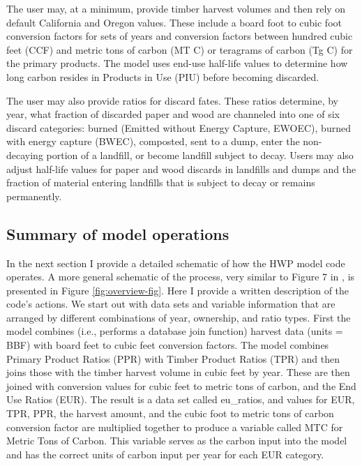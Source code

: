 \documentclass[
]{book}
\begin{document}
The user may, at a minimum, provide timber harvest volumes and then rely on default California and Oregon values. These include a board foot to cubic foot conversion factors for sets of years and conversion factors between hundred cubic feet (CCF) and metric tons of carbon (MT C) or teragrams of carbon (Tg C) for the primary products. The model uses end-use half-life values to determine how long carbon resides in Products in Use (PIU) before becoming discarded.

The user may also provide ratios for discard fates. These ratios determine, by year, what fraction of discarded paper and wood are channeled into one of six discard categories: burned (Emitted without Energy Capture, EWOEC), burned with energy capture (BWEC), composted, sent to a dump, enter the non-decaying portion of a landfill, or become landfill subject to decay. Users may also adjust half-life values for paper and wood discards in landfills and dumps and the fraction of material entering landfills that is subject to decay or remains permanently.

\hypertarget{model-func-opp}{%
\subsection{Summary of model operations}\label{model-func-opp}}

In the next section I provide a detailed schematic of how the HWP model code operates. A more general schematic of the process, very similar to Figure 7 in \citet{stockmann2012}, is presented in Figure \ref{fig:overview-fig}. Here I provide a written description of the code's actions. We start out with data sets and variable information that are arranged by different combinations of year, ownership, and ratio types. First the model combines (i.e., performs a database join function) harvest data (units = BBF) with board feet to cubic feet conversion factors. The model combines Primary Product Ratios (PPR) with Timber Product Ratios (TPR) and then joins those with the timber harvest volume in cubic feet by year. These are then joined with conversion values for cubic feet to metric tons of carbon, and the End Use Ratios (EUR). The result is a data set called eu\_ratios, and values for EUR, TPR, PPR, the harvest amount, and the cubic foot to metric tons of carbon conversion factor are multiplied together to produce a variable called MTC for Metric Tons of Carbon. This variable serves as the carbon input into the model and has the correct units of carbon input per year for each EUR category.
\end{document}
